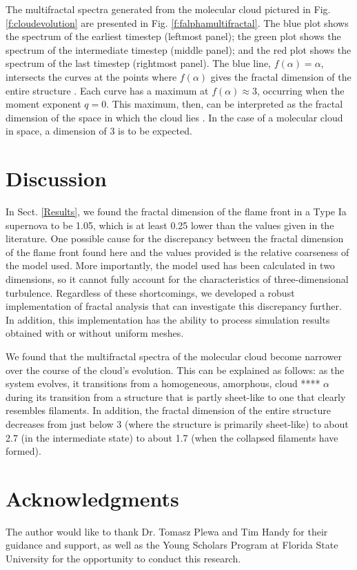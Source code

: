\documentclass{emulateapj}
\begin{document}
The multifractal spectra generated from the molecular cloud pictured in Fig. \ref{f:cloudevolution} are presented in Fig. \ref{f:falphamultifractal}. The blue plot shows the spectrum of the earliest timestep (leftmost panel); the green plot shows the spectrum of the intermediate timestep (middle panel); and the red plot shows the spectrum of the last timestep (rightmost panel). The blue line, $f(\alpha) = \alpha $, intersects the curves at the points where $f(\alpha)$ gives the fractal dimension of the entire structure \citep{mandelbrotmultifractal}. Each curve has a maximum at $f(\alpha) \approx 3$, occurring when the moment exponent $q = 0$. This maximum, then, can be interpreted as the fractal dimension of the space in which the cloud lies \citep{Schroeder}. In the case of a molecular cloud in space, a dimension of 3 is to be expected. 

\section{Discussion}\label{Discussion}
In Sect. \ref{Results}, we found the fractal dimension of the flame front in a Type Ia supernova to be 1.05, which is at least 0.25 lower than the values given in the literature. One possible cause for the discrepancy between the fractal dimension of the flame front found here and the values provided is the relative coarseness of the model used. More importantly, the model used has been calculated in two dimensions, so it cannot fully account for the characteristics of three-dimensional turbulence. Regardless of these shortcomings, we developed a robust implementation of fractal analysis that can investigate this discrepancy further. In addition, this implementation has the ability to process simulation results obtained with or without uniform meshes.
 
We found that the multifractal spectra of the molecular cloud become narrower over the course of the cloud's evolution. This can be explained as follows: as the system evolves, it transitions from a homogeneous, amorphous, cloud **** $ \alpha $ during its transition from a structure that is partly sheet-like to one that clearly resembles filaments. In addition, the fractal dimension of the entire structure decreases from just below 3 (where the structure is primarily sheet-like) to about 2.7 (in the intermediate state) to about 1.7 (when the collapsed filaments have formed).

\section{Acknowledgments}\label{s:ack}
The author would like to thank Dr. Tomasz Plewa and Tim Handy for their guidance and support, as well as the Young Scholars Program at Florida State University for the opportunity to conduct this research.
%
%


%
%
%
\end{document}
